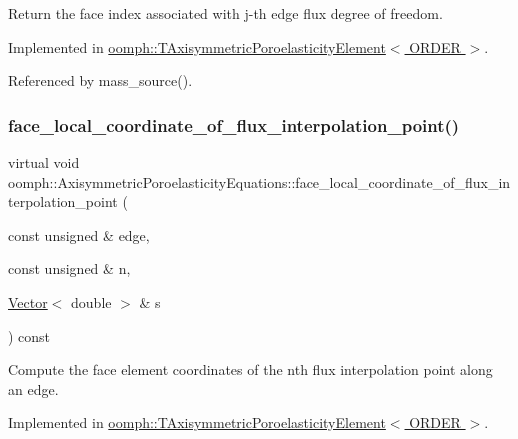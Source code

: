 Return the face index associated with j-\/th edge flux degree of freedom. 



Implemented in \hyperlink{classoomph_1_1TAxisymmetricPoroelasticityElement_ac7f6238d6a5734895b6b04812873e66a}{oomph\+::\+T\+Axisymmetric\+Poroelasticity\+Element$<$ O\+R\+D\+E\+R $>$}.



Referenced by mass\+\_\+source().

\mbox{\label{classoomph_1_1AxisymmetricPoroelasticityEquations_a5e84b1b9a6baa7b5fa83ad32c2734cfb}} 
\subsubsection{\texorpdfstring{face\+\_\+local\+\_\+coordinate\+\_\+of\+\_\+flux\+\_\+interpolation\+\_\+point()}{face\_local\_coordinate\_of\_flux\_interpolation\_point()}}
{\footnotesize\ttfamily virtual void oomph\+::\+Axisymmetric\+Poroelasticity\+Equations\+::face\+\_\+local\+\_\+coordinate\+\_\+of\+\_\+flux\+\_\+interpolation\+\_\+point (\begin{DoxyParamCaption}\item[{const unsigned \&}]{edge,  }\item[{const unsigned \&}]{n,  }\item[{\hyperlink{classoomph_1_1Vector}{Vector}$<$ double $>$ \&}]{s }\end{DoxyParamCaption}) const\hspace{0.3cm}{\ttfamily [pure virtual]}}



Compute the face element coordinates of the nth flux interpolation point along an edge. 



Implemented in \hyperlink{classoomph_1_1TAxisymmetricPoroelasticityElement_affd83cf08ab80d7888634ff2c1f58c76}{oomph\+::\+T\+Axisymmetric\+Poroelasticity\+Element$<$ O\+R\+D\+E\+R $>$}.



